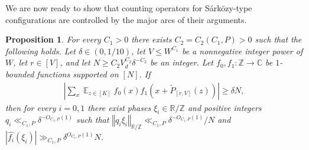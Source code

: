 \documentclass[11pt]{amsart}
\newtheorem{proposition}[lemma]{Proposition}
\theoremstyle{definition}
\DeclareMathOperator*{\E}{\mathbb{E}}
\newcommand{\C}{{\mathbb C}}
\newcommand{\R}{{\mathbb R}}
\newcommand{\Z}{{\mathbb Z}}
\newcommand{\norm}[1]{\left\Vert #1\right\Vert}
\newcommand{\abs}[1]{\mathopen{}\left| #1\mathclose{}\right|}
\begin{document}
We are now ready to show that counting operators for S\'ark\"ozy-type configurations are controlled by the major arcs of their arguments. 

\begin{proposition}\label{P: major arc control}
    For every $C_1>0$ there exists $C_2 = C_2(C_1, P)>0$ such that the following holds. Let $\delta\in(0, 1/10)$, let $V\leq W^{C_1}$ be a nonnegative integer power of $W$, let $r\in[V]$, and let $N\geq C_2 V_d^{C_2} \delta^{-C_2}$ be an integer. Let $f_0,f_1:\Z\to\C$ be $1$-bounded functions supported on $[N]$. If
    \begin{align}\label{E: Sarkozy input}
        \abs{\sum_x \E_{z\in [K]}f_0(x)f_1(x+\widetilde{P}_{[r, V]}(z))}\geq \delta N,
    \end{align}
    then for every $i=0,1$ there exist phases $\xi_i\in\R/\Z$ and positive integers $q_i\ll_{C_1, P} \delta^{-O_{C_1, P}(1)}$ such that $\norm{q_i\xi_i}_{\R/\Z}\ll_{C_1, P}\delta^{-O_{C_1, P}(1)}/N$ and $|\widehat{f_i}(\xi_i)|\gg_{C_1, P} \delta^{O_{C_1, P}(1)}N$.
\end{proposition}
\end{document}
